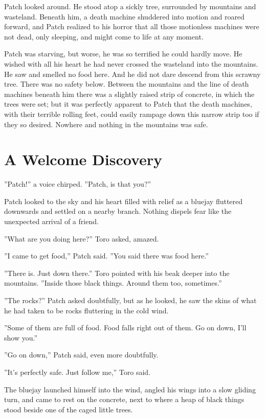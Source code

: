 \documentclass[12pt]{book}
\begin{document}
Patch looked around. He stood atop a sickly tree, surrounded by mountains and wasteland. Beneath him, a death machine shuddered into motion and roared forward, and Patch realized to his horror that all those motionless machines were not dead, only sleeping, and might come to life at any moment.

Patch was starving, but worse, he was so terrified he could hardly move. He wished with all his heart he had never crossed the wasteland into the mountains. He saw and smelled no food here. And he did not dare descend from this scrawny tree. There was no safety below. Between the mountains and the line of death machines beneath him there was a slightly raised strip of concrete, in which the trees were set; but it was perfectly apparent to Patch that the death machines, with their terrible rolling feet, could easily rampage down this narrow strip too if they so desired. Nowhere and nothing in the mountains was safe.


\section{A Welcome Discovery}

''Patch!'' a voice chirped. ''Patch, is that you?''

Patch looked to the sky and his heart filled with relief as a bluejay fluttered downwards and settled on a nearby branch. Nothing dispels fear like the unexpected arrival of a friend.

''What are you doing here?'' Toro asked, amazed.

''I came to get food,'' Patch said. ''You said there was food here.''

''There is. Just down there.'' Toro pointed with his beak deeper into the mountains. ''Inside those black things. Around them too, sometimes.''

''The rocks?'' Patch asked doubtfully, but as he looked, he saw the skins of what he had taken to be rocks fluttering in the cold wind.

''Some of them are full of food. Food falls right out of them. Go on down, I'll show you.''

''Go on down,'' Patch said, even more doubtfully.

''It's perfectly safe. Just follow me,'' Toro said.

The bluejay launched himself into the wind, angled his wings into a slow gliding turn, and came to rest on the concrete, next to where a heap of black things stood beside one of the caged little trees.
\end{document}
